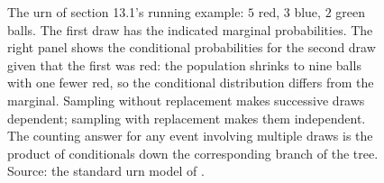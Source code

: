 \begin{figure}[htbp]
\begin{tikzpicture}[
  ball/.style={circle, draw=engblack, minimum size=0.45cm,
    inner sep=0pt, font=\scriptsize},
  node distance=1.2cm,
  edge/.style={-{Stealth}, thick, draw=engblack!70},
]
\end{tikzpicture}
\caption[The urn and the sampling tree]{The urn of section
13.1's running example: $5$ red, $3$ blue, $2$ green balls. The
first draw has the indicated marginal probabilities. The right
panel shows the conditional probabilities for the second draw
given that the first was red: the population shrinks to nine balls
with one fewer red, so the conditional distribution differs from
the marginal. Sampling without replacement makes successive draws
dependent; sampling with replacement makes them independent. The
counting answer for any event involving multiple draws is the
product of conditionals down the corresponding branch of the
tree. Source: the standard urn model of
\cite[ch.~1]{text:ross-probability}.}
\label{fig:vol02:ch13:urn-counting}
\end{figure}
